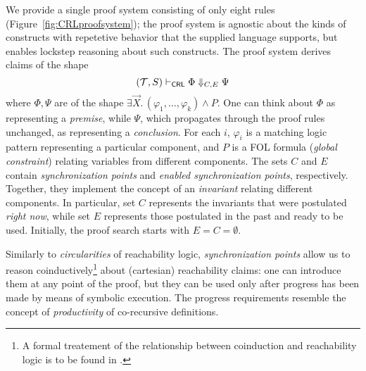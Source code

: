 We provide a single proof system consisting of only eight rules (Figure~\ref{fig:CRLproofsystem});
the proof system is agnostic about the kinds of constructs with repetetive behavior that the supplied language supports,
but enables lockstep reasoning about such constructs.
The proof system derives claims of the shape
\begin{equation*}
(\mathcal{T}, S) \vdash_{\mathsf{CRL}} \Phi \Downarrow_{C,E} \Psi
\end{equation*}
where $\Phi,\Psi$ are of the shape $\exists \vec{X}.\, (\varphi_1, \ldots, \varphi_k) \land P$.
One can think about $\Phi$ as representing a \emph{premise}, while
$\Psi$, which propagates through the proof rules unchanged, as representing a
\emph{conclusion}.  For each $i$, $\varphi_i$ is a matching logic
pattern representing a particular component, and $P$ is a FOL
formula (\emph{global constraint}) relating variables from different
components.  The sets $C$ and $E$ contain \emph{synchronization points} and \emph{enabled
  synchronization points}, respectively.  Together, they implement the concept of an
\emph{invariant} relating different components.  In particular, set $C$
represents the invariants that were postulated \emph{right now}, while set
$E$ represents those postulated in the past and ready to be used.
Initially, the proof search starts with $E = C = \emptyset$.

Similarly to \emph{circularities} of reachability logic, \emph{synchronization points}
allow us to reason coinductively\footnote{A formal treatement of the relationship between coinduction and reachability logic
is to be found in \cite{MoorePR18}.} about (cartesian) reachability claims:
one can introduce them at any point of the proof, but they can be used only after progress has been made
by means of symbolic execution.
The progress requirements resemble the concept of \emph{productivity} of co-recursive definitions.

